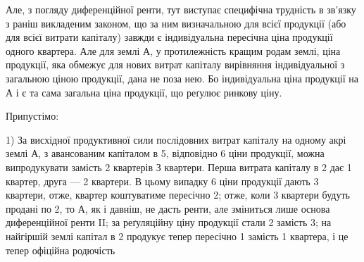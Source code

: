 Але, з погляду диференційної ренти, тут виступає специфічна трудність
в зв’язку з раніш викладеним законом, що за ним визначальною для всієї продукції
(або для всієї витрати капіталу) завжди є індивідуальна пересічна ціна
продукції одного квартера. Але для землі $А$, у протилежність кращим родам
землі, ціна продукції, яка обмежує для нових витрат капіталу вирівняння індивідуальної
з загальною ціною продукції, дана не поза нею. Бо індивідуальна ціна
продукції на $А$ і є та сама загальна ціна продукції, що реґулює ринкову ціну.

Припустімо:

1) За висхідної продуктивної сили послідовних витрат
капіталу на одному акрі землі $А$, з авансованим капіталом в 5,
відповідно 6 ціни продукції, можна випродукувати замість 2 квартерів
З квартери. Перша витрата капіталу в 2 дає 1 квартер, друга — 2 квартери. В цьому
випадку 6 ціни продукції дають 3 квартери,
отже, квартер коштуватиме пересічно 2; отже, коли 3 квартери
будуть продані по 2, то $А$, як і давніш, не дасть ренти, але зміниться
лише основа диференційної ренти II; за реґуляційну ціну продукції стали
2 замість 3; на найгіршій землі капітал в 2
продукує тепер пересічно 1  замість 1 квартера, і це тепер офіційна родючість
\parbreak{}  %
